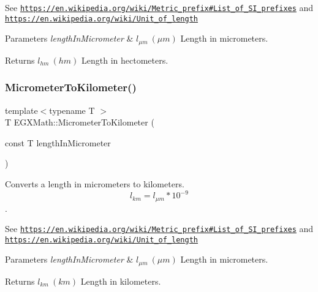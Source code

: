 See \href{https://en.wikipedia.org/wiki/Metric_prefix#List_of_SI_prefixes}{\tt https\+://en.\+wikipedia.\+org/wiki/\+Metric\+\_\+prefix\#\+List\+\_\+of\+\_\+\+S\+I\+\_\+prefixes} and \href{https://en.wikipedia.org/wiki/Unit_of_length}{\tt https\+://en.\+wikipedia.\+org/wiki/\+Unit\+\_\+of\+\_\+length} 
\begin{DoxyParams}{Parameters}
{\em length\+In\+Micrometer} & $ l_{\mu m}\ (\mu m)$ Length in micrometers. \\
\hline
\end{DoxyParams}
\begin{DoxyReturn}{Returns}
$ l_{hm}\ (hm)$ Length in hectometers. 
\end{DoxyReturn}
\mbox{\label{group___e_g_x_math-_conversions-_length_conversions-_micrometer-_s_i_ga50cbd73dda2b126fc5b4425ee80cb3fb}} 
\subsubsection{\texorpdfstring{Micrometer\+To\+Kilometer()}{MicrometerToKilometer()}}
{\footnotesize\ttfamily template$<$typename T $>$ \\
T E\+G\+X\+Math\+::\+Micrometer\+To\+Kilometer (\begin{DoxyParamCaption}\item[{const T}]{length\+In\+Micrometer }\end{DoxyParamCaption})}



Converts a length in micrometers to kilometers. \[ l_{km}=l_{\mu m} * 10^{-9} \]. 

See \href{https://en.wikipedia.org/wiki/Metric_prefix#List_of_SI_prefixes}{\tt https\+://en.\+wikipedia.\+org/wiki/\+Metric\+\_\+prefix\#\+List\+\_\+of\+\_\+\+S\+I\+\_\+prefixes} and \href{https://en.wikipedia.org/wiki/Unit_of_length}{\tt https\+://en.\+wikipedia.\+org/wiki/\+Unit\+\_\+of\+\_\+length} 
\begin{DoxyParams}{Parameters}
{\em length\+In\+Micrometer} & $ l_{\mu m}\ (\mu m)$ Length in micrometers. \\
\hline
\end{DoxyParams}
\begin{DoxyReturn}{Returns}
$ l_{km}\ (km)$ Length in kilometers. 
\end{DoxyReturn}
\mbox{\label{group___e_g_x_math-_conversions-_length_conversions-_micrometer-_s_i_ga95c97884708f4bdf027349dc7535c097}} 
